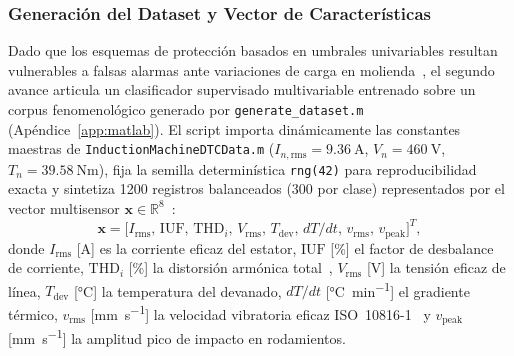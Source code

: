 \subsubsection{Generación del Dataset y Vector de Características}
Dado que los esquemas de protección basados en umbrales univariables resultan vulnerables a falsas alarmas ante variaciones de carga en molienda~\cite{Gao2015,Soualhi2022}, el segundo avance articula un clasificador supervisado multivariable entrenado sobre un corpus fenomenológico generado por \texttt{generate\_\allowbreak dataset.m} (Apéndice~\ref{app:matlab}). El script importa dinámicamente las constantes maestras de \texttt{Induction\allowbreak Machine\allowbreak DTC\allowbreak Data.m} ($I_{n,\text{rms}}=\qty{9.36}{\ampere}$, $V_n=\qty{460}{\volt}$, $T_n=\qty{39.58}{\newton\meter}$), fija la semilla determinística \texttt{rng(42)} para reproducibilidad exacta y sintetiza \num{1200} registros balanceados (\num{300} por clase) representados por el vector multisensor $\mathbf{x}\in\mathbb{R}^8$~\cite{AI2026}:
\begin{equation}
    \mathbf{x} = \bigl[I_{\text{rms}},\,\text{IUF},\,\text{THD}_i,\,V_{\text{rms}},\,T_{\text{dev}},\,dT/dt,\,v_{\text{rms}},\,v_{\text{peak}}\bigr]^T,
    \label{eq:vector_x8}
\end{equation}
donde $I_{\text{rms}}$ [\unit{\ampere}] es la corriente eficaz del estator, $\text{IUF}$ [\unit{\percent}] el factor de desbalance de corriente, $\text{THD}_i$ [\unit{\percent}] la distorsión armónica total~\cite{IEEE519}, $V_{\text{rms}}$ [\unit{\volt}] la tensión eficaz de línea, $T_{\text{dev}}$ [\unit{\celsius}] la temperatura del devanado, $dT/dt$ [\unit{\celsius\per\minute}] el gradiente térmico, $v_{\text{rms}}$ [\unit{\milli\meter\per\second}] la velocidad vibratoria eficaz ISO~10816-1~\cite{ISO10816} y $v_{\text{peak}}$ [\unit{\milli\meter\per\second}] la amplitud pico de impacto en rodamientos.

